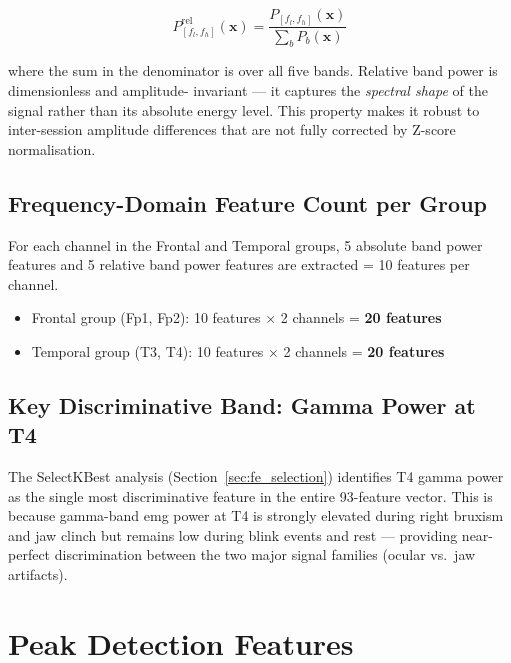 \begin{equation}
P^{\text{rel}}_{[f_l,f_h]}(\mathbf{x}) =
\frac{P_{[f_l,f_h]}(\mathbf{x})}
{\sum_b P_b(\mathbf{x})}
\label{eq:rel_bandpower}
\end{equation}

\noindent where the sum in the denominator is over all five
bands. Relative band power is dimensionless and amplitude-
invariant — it captures the \textit{spectral shape} of the
signal rather than its absolute energy level. This property
makes it robust to inter-session amplitude differences that
are not fully corrected by Z-score normalisation.

\subsection{Frequency-Domain Feature Count per Group}

For each channel in the Frontal and Temporal groups, 5
absolute band power features and 5 relative band power
features are extracted = 10 features per channel.

\begin{itemize}[leftmargin=*]
    \item Frontal group (Fp1, Fp2): 10 features
    $\times$ 2 channels = \textbf{20 features}
    \item Temporal group (T3, T4): 10 features
    $\times$ 2 channels = \textbf{20 features}
\end{itemize}

\subsection{Key Discriminative Band: Gamma Power at T4}

The SelectKBest analysis (Section~\ref{sec:fe_selection})
identifies T4 gamma power as the single most discriminative
feature in the entire 93-feature vector. This is because
gamma-band \acrshort{emg} power at T4 is strongly elevated
during right bruxism and jaw clinch but remains low during
blink events and rest — providing near-perfect discrimination
between the two major signal families (ocular vs.\ jaw
artifacts).

\section{Peak Detection Features}
\label{sec:fe_peak}

